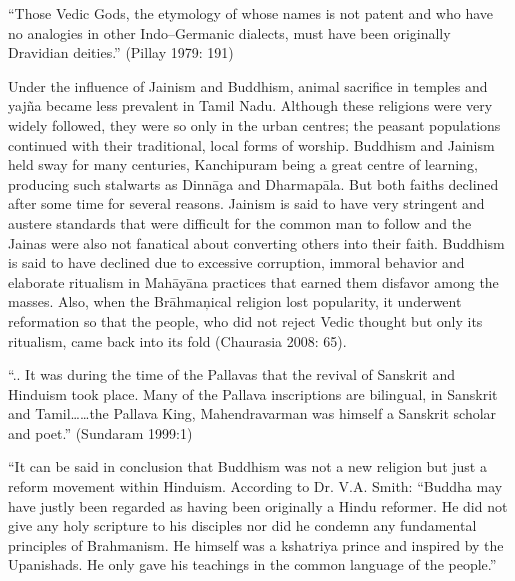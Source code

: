 \begin{myquote}
“Those Vedic Gods, the etymology of whose names is not patent and who have no analogies in other Indo–Germanic dialects, must have been originally Dravidian deities.” (Pillay 1979: 191)
\end{myquote}

Under the influence of Jainism and Buddhism, animal sacrifice in temples and yajña became less prevalent in Tamil Nadu. Although these religions were very widely followed, they were so only in the urban centres; the peasant populations continued with their traditional, local forms of worship. Buddhism and Jainism held sway for many centuries, Kanchipuram being a great centre of learning, producing such stalwarts as Dinnāga and Dharmapāla. But both faiths declined after some time for several reasons. Jainism is said to have very stringent and austere standards that were difficult for the common man to follow and the Jainas were also not fanatical about converting others into their faith. Buddhism is said to have declined due to excessive corruption, immoral behavior and elaborate ritualism in Mahāyāna practices that earned them disfavor among the masses. Also, when the Brāhmaņical religion lost popularity, it underwent reformation so that the people, who did not reject Vedic thought but only its ritualism, came back into its fold (Chaurasia 2008: 65).

\vskip 2pt

\begin{myquote}
“.. It was during the time of the Pallavas that the revival of Sanskrit and Hinduism took place. Many of the Pallava inscriptions are bilingual, in Sanskrit and Tamil……the Pallava King, Mahendravarman was himself a Sanskrit scholar and poet.” (Sundaram 1999:1)
\end{myquote}

\vskip 2pt

\begin{myquote}
“It can be said in conclusion that Buddhism was not a new religion but just a reform movement within Hinduism. According to Dr. V.A. Smith: “Buddha may have justly been regarded as having been originally a Hindu reformer. He did not give any holy scripture to his disciples nor did he condemn any fundamental principles of Brahmanism. He himself was a kshatriya prince and inspired by the Upanishads. He only gave his teachings in the common language of the people.”
\end{myquote}

